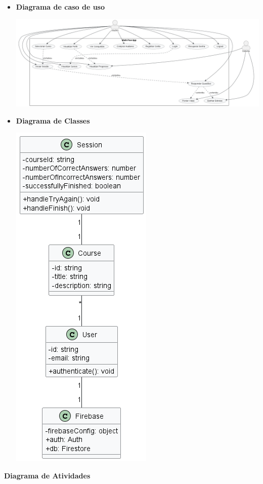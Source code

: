 \documentclass[12pt, openany, oneside, a4paper, english, brazil]{abntex2}   %
\begin{document}
\begin{itemize}

\item \textbf{Diagrama de caso de uso}

        \begin{center}
    \includegraphics[width=\linewidth]{figuras/DiagramsUMLs/Math Pow Use Case.png}
\end{center}

\item \textbf{Diagrama de Classes}

\begin{center}
\includegraphics[width=0.3\linewidth]{figuras/DiagramsUMLs/Math Pow App.png}
\label{fig:diagrama-de-classes}
\end{center}

\end{itemize}

\item \textbf{Diagrama de Atividades}
\end{document}
